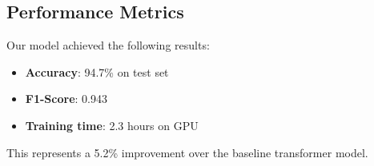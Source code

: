 \documentclass[11pt,letterpaper]{article}
\begin{document}
\subsection{Performance Metrics}

Our model achieved the following results:
\begin{itemize}
\item \textbf{Accuracy}: 94.7\% on test set
\item \textbf{F1-Score}: 0.943
\item \textbf{Training time}: 2.3 hours on GPU
\end{itemize}

This represents a 5.2\% improvement over the baseline transformer model.

 
\end{document}
